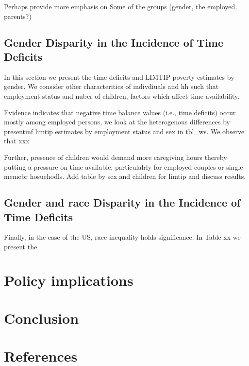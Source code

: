 \documentclass[
  11pt,
]{article}
\begin{document}
Perhaps provide more emphasis on Some of the groups (gender, the
employed, parents?)

\subsection{Gender Disparity in the Incidence of Time
Deficits}\label{gender-disparity-in-the-incidence-of-time-deficits}

In this section we present the time deficits and LIMTIP poverty
estimates by gender. We consider other characteritics of indivdiuals and
hh such that employment status and nuber of children, factors which
affect time availability.

Evidence indicates that negative time balance values (i.e., time
deficits) occur mostly among employed persons, we look at the
heterogenous differences by presentinf limtip estimates by employment
status and sex in tbl\_ws. We observe that xxx

Further, presence of children would demand more caregiving hours thereby
putting a pressure on time available, particulalrly for employed couples
or single memebr hosuehodls. Add table by sex and children for limtip
and discuss results.

\subsection{Gender and race Disparity in the Incidence of Time
Deficits}\label{gender-and-race-disparity-in-the-incidence-of-time-deficits}

Finally, in the case of the US, race inequality holds significance. In
Table xx we present the

\section{Policy implications}\label{policy-implications}

\section{Conclusion}\label{conclusion}

\section*{References}\label{sec-ref}
\end{document}
